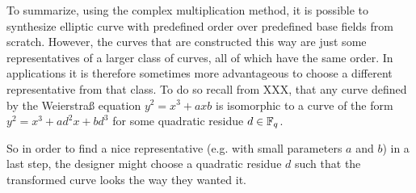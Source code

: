 To summarize, using the complex multiplication method, it is possible to synthesize elliptic curve with predefined order over predefined base fields from scratch. However, the curves that are constructed this way are just some representatives of a larger class of curves, all of which have the same order. In applications it is therefore sometimes more advantageous to choose a different representative from that class. To do so recall from XXX, that any curve defined by the Weierstraß equation $y^2 = x^3 + ax b$ is isomorphic to a curve of the form $y^2 = x^3 + ad^2 x + bd^3$ for some quadratic residue $d\in \mathbb{F}_q$. 

So in order to find a nice representative (e.g. with small parameters $a$ and $b$) in a last step, the designer might choose a quadratic residue $d$ such that the transformed curve looks the way they wanted it.

